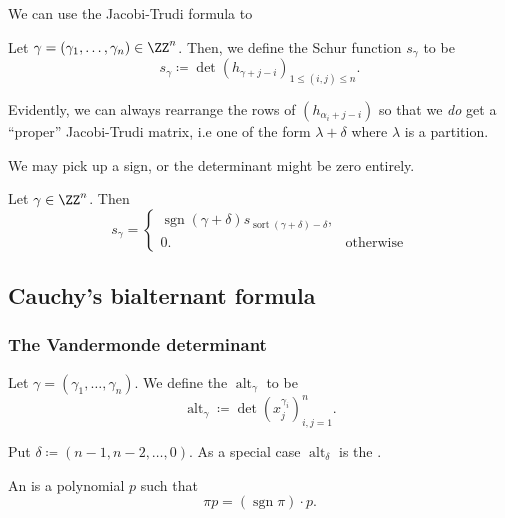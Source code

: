 \documentclass{article}
\DeclareMathOperator{\sgn}{sgn}
\DeclareMathOperator{\sort}{sort}
\DeclareMathOperator{\alt}{alt}
\begin{document}
We can use the Jacobi-Trudi formula to 

\begin{definition}
    Let $\gamma = (\gamma_1,\ldots,\gamma_n) \in \ZZ^n$.
    Then, we define the Schur function $s_\gamma$ to be
    \[
        s_\gamma \coloneq \det (h_{\gamma+j-i})_{1 \leq (i,j) \leq n}.
    \]
\end{definition}

Evidently, we can always rearrange the rows of $(h_{\alpha_i+j-i})$ so that we \textit{do} get a ``proper'' Jacobi-Trudi matrix, i.e one of the form $\lambda + \delta$ where $\lambda$ is a partition.

We may pick up a sign, or the determinant might be zero entirely.

\begin{theorem}
   Let $\gamma \in \ZZ^n$. 
   Then
   \[
       s_\gamma = \begin{cases}
           \sgn(\gamma + \delta)s_{\sort(\gamma+\delta)-\delta}, & \\
           0. & \text{otherwise}
       \end{cases}
   \]
\end{theorem}

\begin{example}
\end{example}

\subsection{Cauchy's bialternant formula}

\subsubsection{The Vandermonde determinant}

\begin{definition}
    Let $\gamma = (\gamma_1,\ldots,\gamma_n)$.
    We define the  $\alt_\gamma$ to be 
    \[
        \alt_\gamma 
        \coloneq 
        \det \left(x_j^{\gamma_i}\right)_{i,j=1}^n.
    \]
\end{definition}

Put $\delta \coloneq (n-1,n-2,\ldots,0)$.
As a special case $\alt_\delta$ is the .

\begin{definition}
    An  is a polynomial $p$ such that
    \[
        \pi p
        = 
        (\sgn \pi) \cdot p.
    \]
\end{definition}
\end{document}
